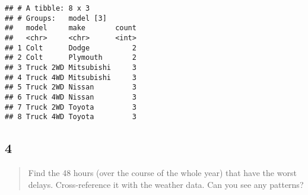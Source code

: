 \documentclass[]{ltjsarticle}
\newenvironment{Shaded}{\begin{snugshade}}{\end{snugshade}}
\newcommand{\DataTypeTok}[1]{\textcolor[rgb]{0.13,0.29,0.53}{#1}}
\newcommand{\DecValTok}[1]{\textcolor[rgb]{0.00,0.00,0.81}{#1}}
\newcommand{\KeywordTok}[1]{\textcolor[rgb]{0.13,0.29,0.53}{\textbf{#1}}}
\newcommand{\NormalTok}[1]{#1}
\newcommand{\OperatorTok}[1]{\textcolor[rgb]{0.81,0.36,0.00}{\textbf{#1}}}
\newcommand{\OtherTok}[1]{\textcolor[rgb]{0.56,0.35,0.01}{#1}}
\newcommand{\StringTok}[1]{\textcolor[rgb]{0.31,0.60,0.02}{#1}}
\begin{document}
\begin{verbatim}
## # A tibble: 8 x 3
## # Groups:   model [3]
##   model     make       count
##   <chr>     <chr>      <int>
## 1 Colt      Dodge          2
## 2 Colt      Plymouth       2
## 3 Truck 2WD Mitsubishi     3
## 4 Truck 4WD Mitsubishi     3
## 5 Truck 2WD Nissan         3
## 6 Truck 4WD Nissan         3
## 7 Truck 2WD Toyota         3
## 8 Truck 4WD Toyota         3
\end{verbatim}

\hypertarget{section-21}{%
\subsection{4}\label{section-21}}

\begin{quote}
Find the 48 hours (over the course of the whole year) that have the
worst delays. Cross-reference it with the weather data. Can you see any
patterns?
\end{quote}

\begin{Shaded}
\end{Shaded}
\end{document}
